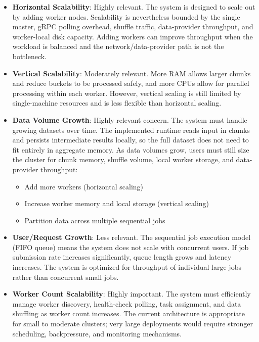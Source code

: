 \documentclass{scrartcl}
\begin{document}
\begin{itemize}
    \item \textbf{Horizontal Scalability}: Highly relevant. The system is designed to scale out by adding worker nodes. Scalability is nevertheless bounded by the single master, gRPC polling overhead, shuffle traffic, data-provider throughput, and worker-local disk capacity. Adding workers can improve throughput when the workload is balanced and the network/data-provider path is not the bottleneck.

    \item \textbf{Vertical Scalability}: Moderately relevant. More RAM allows larger chunks and reduce buckets to be processed safely, and more CPUs allow for parallel processing within each worker. However, vertical scaling is still limited by single-machine resources and is less flexible than horizontal scaling.

    \item \textbf{Data Volume Growth}: Highly relevant concern. The system must handle growing datasets over time. The implemented runtime reads input in chunks and persists intermediate results locally, so the full dataset does not need to fit entirely in aggregate memory. As data volumes grow, users must still size the cluster for chunk memory, shuffle volume, local worker storage, and data-provider throughput:
          \begin{itemize}
              \item Add more workers (horizontal scaling)
              \item Increase worker memory and local storage (vertical scaling)
              \item Partition data across multiple sequential jobs
          \end{itemize}

    \item \textbf{User/Request Growth}: Less relevant. The sequential job execution model (FIFO queue) means the system does not scale with concurrent users. If job submission rate increases significantly, queue length grows and latency increases. The system is optimized for throughput of individual large jobs rather than concurrent small jobs.

    \item \textbf{Worker Count Scalability}: Highly important. The system must efficiently manage worker discovery, health-check polling, task assignment, and data shuffling as worker count increases. The current architecture is appropriate for small to moderate clusters; very large deployments would require stronger scheduling, backpressure, and monitoring mechanisms.
\end{itemize}
\end{document}
